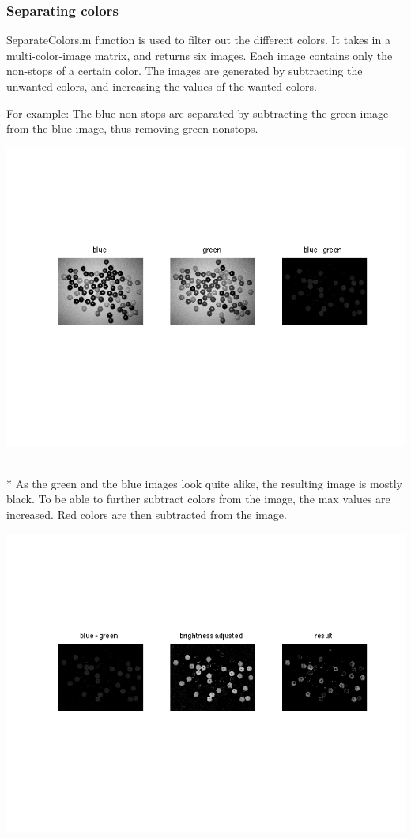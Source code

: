 \subsubsection{Separating colors}
SeparateColors.m function is used to filter out the different colors. It takes in a multi-color-image matrix, and returns six images. Each image contains only the non-stops of a certain color. The images are generated by subtracting the unwanted colors, and increasing the values of the wanted colors.

For example: The blue non-stops are separated by subtracting the green-image from the blue-image, thus removing green nonstops. 
\\
\centerline{\includegraphics[clip=true, trim=40 100 40 80]{separate_step1.png}}
\\*
As the green and the blue images look quite alike, the resulting image is mostly black. To be able to further subtract colors from the image, the max values are increased. Red colors are then subtracted from the image.
\\
\centerline{\includegraphics[clip=true, trim=40 100 40 80]{separate_step2_1.png}}
